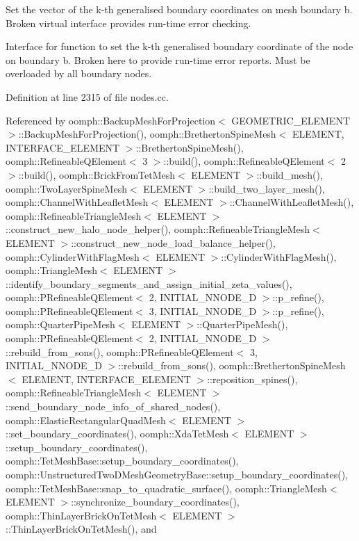 Set the vector of the k-\/th generalised boundary coordinates on mesh boundary b. Broken virtual interface provides run-\/time error checking. 

Interface for function to set the k-\/th generalised boundary coordinate of the node on boundary b. Broken here to provide run-\/time error reports. Must be overloaded by all boundary nodes. 

Definition at line 2315 of file nodes.\+cc.



Referenced by oomph\+::\+Backup\+Mesh\+For\+Projection$<$ G\+E\+O\+M\+E\+T\+R\+I\+C\+\_\+\+E\+L\+E\+M\+E\+N\+T $>$\+::\+Backup\+Mesh\+For\+Projection(), oomph\+::\+Bretherton\+Spine\+Mesh$<$ E\+L\+E\+M\+E\+N\+T, I\+N\+T\+E\+R\+F\+A\+C\+E\+\_\+\+E\+L\+E\+M\+E\+N\+T $>$\+::\+Bretherton\+Spine\+Mesh(), oomph\+::\+Refineable\+Q\+Element$<$ 3 $>$\+::build(), oomph\+::\+Refineable\+Q\+Element$<$ 2 $>$\+::build(), oomph\+::\+Brick\+From\+Tet\+Mesh$<$ E\+L\+E\+M\+E\+N\+T $>$\+::build\+\_\+mesh(), oomph\+::\+Two\+Layer\+Spine\+Mesh$<$ E\+L\+E\+M\+E\+N\+T $>$\+::build\+\_\+two\+\_\+layer\+\_\+mesh(), oomph\+::\+Channel\+With\+Leaflet\+Mesh$<$ E\+L\+E\+M\+E\+N\+T $>$\+::\+Channel\+With\+Leaflet\+Mesh(), oomph\+::\+Refineable\+Triangle\+Mesh$<$ E\+L\+E\+M\+E\+N\+T $>$\+::construct\+\_\+new\+\_\+halo\+\_\+node\+\_\+helper(), oomph\+::\+Refineable\+Triangle\+Mesh$<$ E\+L\+E\+M\+E\+N\+T $>$\+::construct\+\_\+new\+\_\+node\+\_\+load\+\_\+balance\+\_\+helper(), oomph\+::\+Cylinder\+With\+Flag\+Mesh$<$ E\+L\+E\+M\+E\+N\+T $>$\+::\+Cylinder\+With\+Flag\+Mesh(), oomph\+::\+Triangle\+Mesh$<$ E\+L\+E\+M\+E\+N\+T $>$\+::identify\+\_\+boundary\+\_\+segments\+\_\+and\+\_\+assign\+\_\+initial\+\_\+zeta\+\_\+values(), oomph\+::\+P\+Refineable\+Q\+Element$<$ 2, I\+N\+I\+T\+I\+A\+L\+\_\+\+N\+N\+O\+D\+E\+\_\+D $>$\+::p\+\_\+refine(), oomph\+::\+P\+Refineable\+Q\+Element$<$ 3, I\+N\+I\+T\+I\+A\+L\+\_\+\+N\+N\+O\+D\+E\+\_\+D $>$\+::p\+\_\+refine(), oomph\+::\+Quarter\+Pipe\+Mesh$<$ E\+L\+E\+M\+E\+N\+T $>$\+::\+Quarter\+Pipe\+Mesh(), oomph\+::\+P\+Refineable\+Q\+Element$<$ 2, I\+N\+I\+T\+I\+A\+L\+\_\+\+N\+N\+O\+D\+E\+\_\+D $>$\+::rebuild\+\_\+from\+\_\+sons(), oomph\+::\+P\+Refineable\+Q\+Element$<$ 3, I\+N\+I\+T\+I\+A\+L\+\_\+\+N\+N\+O\+D\+E\+\_\+D $>$\+::rebuild\+\_\+from\+\_\+sons(), oomph\+::\+Bretherton\+Spine\+Mesh$<$ E\+L\+E\+M\+E\+N\+T, I\+N\+T\+E\+R\+F\+A\+C\+E\+\_\+\+E\+L\+E\+M\+E\+N\+T $>$\+::reposition\+\_\+spines(), oomph\+::\+Refineable\+Triangle\+Mesh$<$ E\+L\+E\+M\+E\+N\+T $>$\+::send\+\_\+boundary\+\_\+node\+\_\+info\+\_\+of\+\_\+shared\+\_\+nodes(), oomph\+::\+Elastic\+Rectangular\+Quad\+Mesh$<$ E\+L\+E\+M\+E\+N\+T $>$\+::set\+\_\+boundary\+\_\+coordinates(), oomph\+::\+Xda\+Tet\+Mesh$<$ E\+L\+E\+M\+E\+N\+T $>$\+::setup\+\_\+boundary\+\_\+coordinates(), oomph\+::\+Tet\+Mesh\+Base\+::setup\+\_\+boundary\+\_\+coordinates(), oomph\+::\+Unstructured\+Two\+D\+Mesh\+Geometry\+Base\+::setup\+\_\+boundary\+\_\+coordinates(), oomph\+::\+Tet\+Mesh\+Base\+::snap\+\_\+to\+\_\+quadratic\+\_\+surface(), oomph\+::\+Triangle\+Mesh$<$ E\+L\+E\+M\+E\+N\+T $>$\+::synchronize\+\_\+boundary\+\_\+coordinates(), oomph\+::\+Thin\+Layer\+Brick\+On\+Tet\+Mesh$<$ E\+L\+E\+M\+E\+N\+T $>$\+::\+Thin\+Layer\+Brick\+On\+Tet\+Mesh(), and 